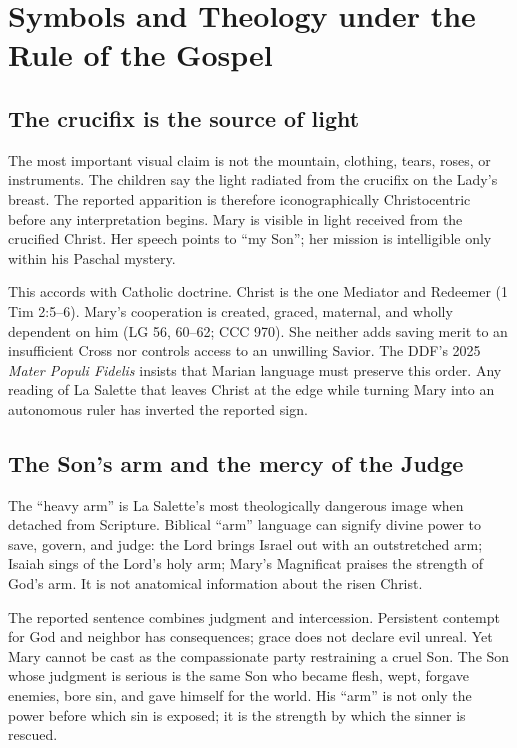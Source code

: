 \section{Symbols and Theology under the Rule of the Gospel}

\subsection{The crucifix is the source of light}

The most important visual claim is not the mountain, clothing, tears, roses, or instruments. The children say the light radiated from the crucifix on the Lady's breast. The reported apparition is therefore iconographically Christocentric before any interpretation begins. Mary is visible in light received from the crucified Christ. Her speech points to ``my Son''; her mission is intelligible only within his Paschal mystery.

This accords with Catholic doctrine. Christ is the one Mediator and Redeemer (1 Tim 2:5--6). Mary's cooperation is created, graced, maternal, and wholly dependent on him (LG 56, 60--62; CCC 970). She neither adds saving merit to an insufficient Cross nor controls access to an unwilling Savior. The DDF's 2025 \emph{Mater Populi Fidelis} insists that Marian language must preserve this order. Any reading of La Salette that leaves Christ at the edge while turning Mary into an autonomous ruler has inverted the reported sign.

\subsection{The Son's arm and the mercy of the Judge}

The ``heavy arm'' is La Salette's most theologically dangerous image when detached from Scripture. Biblical ``arm'' language can signify divine power to save, govern, and judge: the Lord brings Israel out with an outstretched arm; Isaiah sings of the Lord's holy arm; Mary's Magnificat praises the strength of God's arm. It is not anatomical information about the risen Christ.

The reported sentence combines judgment and intercession. Persistent contempt for God and neighbor has consequences; grace does not declare evil unreal. Yet Mary cannot be cast as the compassionate party restraining a cruel Son. The Son whose judgment is serious is the same Son who became flesh, wept, forgave enemies, bore sin, and gave himself for the world. His ``arm'' is not only the power before which sin is exposed; it is the strength by which the sinner is rescued.

